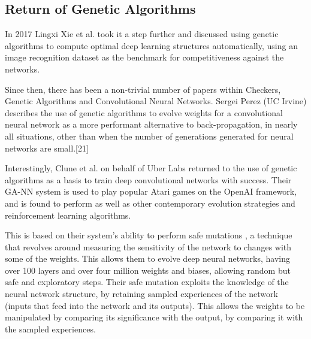 \documentclass[12pt,a4paper]{article}
\begin{document}

    \subsection{Return of Genetic Algorithms}
        In 2017 Lingxi Xie et al. took it a step further and discussed using genetic algorithms to compute optimal deep learning structures automatically, using an image recognition dataset as the benchmark for competitiveness against the networks.\cite{xie_genetic_2017}

        Since then, there has been a non-trivial number of papers within Checkers, Genetic Algorithms and Convolutional Neural Networks. Sergei Perez (UC Irvine) describes the use of genetic algorithms to evolve weights for a convolutional neural network as a more performant alternative to back-propagation, in nearly all situations, other than when the number of generations generated for neural networks are small.[21]

        Interestingly, Clune et al. on behalf of Uber Labs returned to the use of genetic algorithms as a basis to train deep convolutional networks with success. \cite{such_deep_2017} Their GA-NN system is used to play popular Atari games on the OpenAI framework, and is found to perform as well as other contemporary evolution strategies and reinforcement learning algorithms. 

        This is based on their system's ability to perform safe mutations \cite{lehman_safe_2017}, a technique that revolves around measuring the sensitivity of the network to changes with some of the weights. This allows them to evolve deep neural networks, having over 100 layers and over four million weights and biases, allowing random but safe and exploratory steps. Their safe mutation exploits the knowledge of the neural network structure, by retaining sampled experiences of the network (inputs that feed into the network and its outputs). This allows the weights to be manipulated by comparing its significance with the output, by comparing it with the sampled experiences. 
\end{document}
